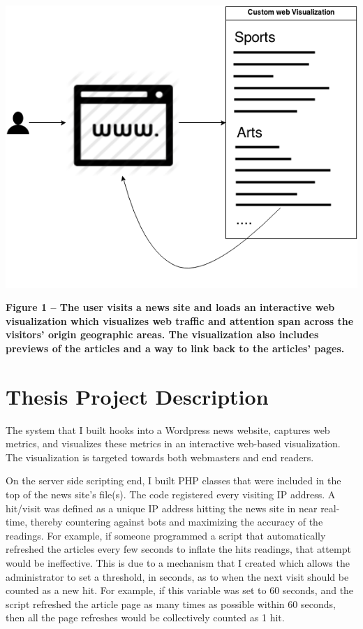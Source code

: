 \documentclass[12pt]{article}
\begin{document}
\includegraphics[scale=0.6]{img/overall_chart}

\noindent\textbf{Figure 1 -- The user visits a news site and loads an interactive web visualization which visualizes web traffic and attention span across the visitors' origin geographic areas. The visualization also includes previews of the articles and a way to link back to the articles' pages.}

\vfill

\section{Thesis Project Description}
The system that I built hooks into a Wordpress news website, captures web metrics, and visualizes these metrics in an interactive web-based visualization. The visualization is targeted towards both webmasters and end readers. 

On the server side scripting end, I built PHP classes that were included in the top of the news site's file(s). The code registered every visiting IP address. A hit/visit was defined as a unique IP address hitting the news site in near real-time, thereby countering against bots and maximizing the accuracy of the readings. For example, if someone programmed a script that automatically refreshed the articles every few seconds to inflate the hits readings, that attempt would be ineffective. This is due to a mechanism that I created which allows the administrator to set a threshold, in seconds, as to when the next visit should be counted as a new hit. For example, if this variable was set to 60 seconds, and the script refreshed the article page as many times as possible within 60 seconds, then all the page refreshes would be collectively counted as 1 hit. 
\end{document}
